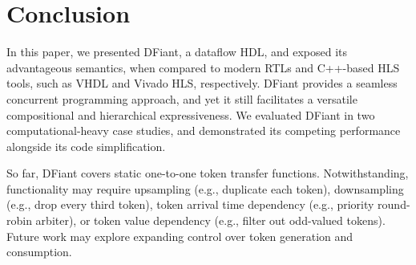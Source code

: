 \section{Conclusion}
\label{sec:conclusion}
In this paper, we presented DFiant, a dataflow HDL, and exposed its advantageous semantics, when compared to modern RTLs and C++-based HLS tools, such as VHDL and Vivado HLS, respectively. DFiant provides a seamless concurrent programming approach, and yet it still facilitates a versatile compositional and hierarchical expressiveness. We evaluated DFiant in two computational-heavy case studies, and demonstrated its competing performance alongside its code simplification. 

So far, DFiant covers static one-to-one token transfer functions. Notwithstanding, functionality may require upsampling (e.g., duplicate each token), downsampling (e.g., drop every third token), token arrival time dependency (e.g., priority round-robin arbiter), or token value dependency (e.g., filter out odd-valued tokens). Future work may explore expanding control over token generation and consumption. 
